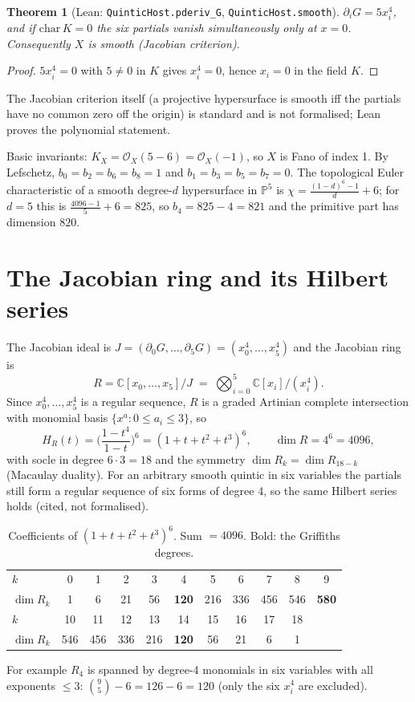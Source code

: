 \documentclass[11pt]{article}
\newtheorem{theorem}{Theorem}[section]\newtheorem{proposition}[theorem]{Proposition}
\theoremstyle{definition}\newtheorem{definition}[theorem]{Definition}\newtheorem{remark}[theorem]{Remark}
\newcommand{\PP}{\mathbb{P}}\newcommand{\CC}{\mathbb{C}}\newcommand{\QQ}{\mathbb{Q}}
\begin{document}
\begin{theorem}[Lean: \texttt{QuinticHost.pderiv\_G}, \texttt{QuinticHost.smooth}]
$\partial_iG=5x_i^4$, and if $\mathrm{char}\,K=0$ the six partials vanish simultaneously only at $x=0$.
Consequently $X$ is smooth (Jacobian criterion).
\end{theorem}
\begin{proof}
$5x_i^4=0$ with $5\neq0$ in $K$ gives $x_i^4=0$, hence $x_i=0$ in the field $K$.
\end{proof}
The Jacobian criterion itself (a projective hypersurface is smooth iff the partials have no common zero
off the origin) is standard and is not formalised; Lean proves the polynomial statement.

Basic invariants: $K_X=\mathcal O_X(5-6)=\mathcal O_X(-1)$, so $X$ is Fano of index 1. By Lefschetz,
$b_0=b_2=b_6=b_8=1$ and $b_1=b_3=b_5=b_7=0$. The topological Euler characteristic of a smooth degree-$d$
hypersurface in $\PP^5$ is $\chi=\frac{(1-d)^6-1}{d}+6$; for $d=5$ this is $\frac{4096-1}{5}+6=825$,
so $b_4=825-4=821$ and the primitive part has dimension $820$.

\section{The Jacobian ring and its Hilbert series}\label{sec:jac}
The Jacobian ideal is $J=(\partial_0G,\dots,\partial_5G)=(x_0^4,\dots,x_5^4)$ and the Jacobian ring is
\[ R=\CC[x_0,\dots,x_5]/J \;=\;\bigotimes_{i=0}^5 \CC[x_i]/(x_i^4). \]
Since $x_0^4,\dots,x_5^4$ is a regular sequence, $R$ is a graded Artinian complete intersection with monomial
basis $\{x^a: 0\le a_i\le3\}$, so
\[ H_R(t)=\Big(\frac{1-t^4}{1-t}\Big)^6=(1+t+t^2+t^3)^6,\qquad \dim R=4^6=4096, \]
with socle in degree $6\cdot 3=18$ and the symmetry $\dim R_k=\dim R_{18-k}$ (Macaulay duality).
For an arbitrary smooth quintic in six variables the partials still form a regular sequence of six forms
of degree 4, so the same Hilbert series holds (cited, not formalised).
\begin{table}[h]\centering\small
\begin{tabular}{l*{10}{c}}\toprule
$k$ & 0&1&2&3&4&5&6&7&8&9\\
$\dim R_k$ & 1&6&21&56&\textbf{120}&216&336&456&546&\textbf{580}\\\midrule
$k$ & 10&11&12&13&14&15&16&17&18&\\
$\dim R_k$ & 546&456&336&216&\textbf{120}&56&21&6&1&\\\bottomrule
\end{tabular}
\caption{Coefficients of $(1+t+t^2+t^3)^6$. Sum $=4096$. Bold: the Griffiths degrees.}\label{tab:series}
\end{table}
For example $R_4$ is spanned by degree-4 monomials in six variables with all exponents $\le 3$:
$\binom{9}{5}-6=126-6=120$ (only the six $x_i^4$ are excluded).
\end{document}

